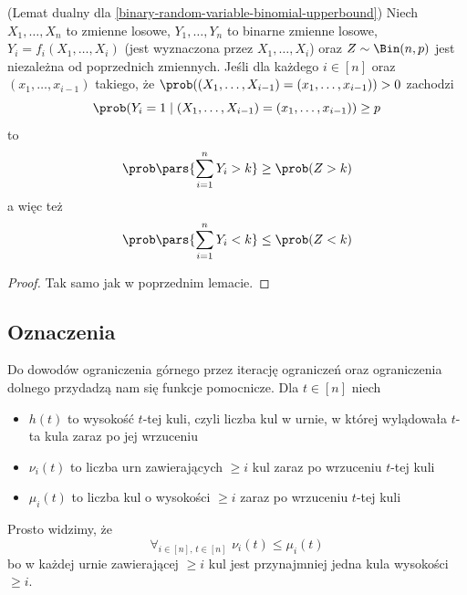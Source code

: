 \begin{lemma} (Lemat dualny dla \ref{binary-random-variable-binomial-upperbound})
	\label{binary-random-variable-binomial-lowerbound}
	Niech \(X_1, \dots, X_n\) to zmienne losowe, \(Y_1, \dots, Y_n\) to binarne zmienne losowe, \(Y_i = f_i(X_1, \dots, X_i)\) (jest wyznaczona przez \(X_1, \dots, X_i\)) oraz \(Z \sim \Bin(n, p)\) jest niezależna od poprzednich zmiennych. Jeśli dla każdego \(i \in [n]\) oraz \((x_1, \dots, x_{i - 1})\) takiego, że \(\prob((X_1, \dots, X_{i - 1}) = (x_1, \dots, x_{i - 1})) > 0\) zachodzi
	\[
		\prob(Y_i = 1 \mid (X_1, \dots, X_{i - 1}) = (x_1, \dots, x_{i - 1})) \geq p
	\]
	to
	\[
		\prob\pars{\sum_{i = 1}^n Y_i > k} \geq \prob(Z > k)
	\]
	a więc też
	\[
		\prob\pars{\sum_{i = 1}^n Y_i < k} \leq \prob(Z < k)
	\]
\end{lemma}
\begin{proof}
	Tak samo jak w poprzednim lemacie.
\end{proof}

\subsection{Oznaczenia}
Do dowodów ograniczenia górnego przez iterację ograniczeń oraz ograniczenia dolnego przydadzą nam się funkcje pomocnicze. Dla \(t \in [n]\) niech
\begin{itemize}
	\item \(h(t)\) to wysokość \(t\)-tej kuli, czyli liczba kul w urnie, w której wylądowała \(t\)-ta kula zaraz po jej wrzuceniu
	\item \(\nu_i(t)\) to liczba urn zawierających \(\geq i\) kul zaraz po wrzuceniu \(t\)-tej kuli
	\item \(\mu_i(t)\) to liczba kul o wysokości \(\geq i\) zaraz po wrzuceniu \(t\)-tej kuli
\end{itemize}

Prosto widzimy, że
\[
	\forall_{i \in [n], \, t \in [n]} \,\, \nu_i(t) \leq \mu_i(t)
\]
bo w każdej urnie zawierającej \(\geq i\) kul jest przynajmniej jedna kula wysokości \(\geq i\).
